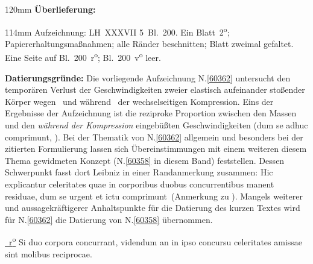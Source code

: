 \begin{ledgroupsized}[r]{120mm}
\footnotesize
\pstart
\noindent\textbf{Überlieferung:}
\pend
\end{ledgroupsized}
\begin{ledgroupsized}[r]{114mm}
\footnotesize
\pstart \parindent -6mm
%
Aufzeichnung:
LH~XXXVII 5~Bl.~200.
Ein Blatt~2\textsuperscript{o};
Papiererhaltungsmaßnahmen;
alle Ränder beschnitten;
Blatt zweimal gefaltet.
Eine Seite auf Bl.~200~r\textsuperscript{o}; Bl.~200~v\textsuperscript{o} leer.
\pend
\end{ledgroupsized}
\vspace{5mm}
\begin{ledgroup}
\footnotesize
\pstart
\noindent%
\textbf{Datierungsgründe:}
Die vorliegende Aufzeichnung N.\;\ref{60362} untersucht den temporären
Verlust der Geschwindigkeiten zweier elastisch aufeinander stoßender Körper wegen \textendash\ und während \textendash\ der wechselseitigen Kompression.
Eins der Ergebnisse der Aufzeichnung ist die reziproke Proportion zwischen den Massen und den \textit{während der Kompression} eingebüßten Geschwindigkeiten
(\glqq dum se adhuc comprimunt\grqq, ).
Bei der Thematik von N.\;\ref{60362} allgemein und besonders bei der zitierten Formulierung 
lassen sich Übereinstimmungen mit einem weiteren diesem Thema gewidmeten Konzept (N.\;\ref{60358} in diesem Band) feststellen.
Dessen Schwerpunkt fasst dort Leibniz in einer Randanmerkung zusammen: 
\glqq Hic explicantur celeritates quae in corporibus duobus concurrentibus manent residuae, dum se urgent et ictu comprimunt\grqq\ (Anmerkung zu ).
\pend
\pstart
Mangels weiterer und aussagekräftigerer Anhaltspunkte für die Datierung des kurzen Textes wird für N.\;\ref{60362} die Datierung von N.\;\ref{60358} übernommen.
\pend 
\end{ledgroup}
\vspace{8mm}
\pstart
\noindent
\href{\Scan{LH_37_05_200r}}%
{~r\textsuperscript{o}\rbrack}
Si duo corpora 
concurrant,
videndum
an in ipso concursu celeritates amissae%
sint molibus
%
reciprocae.%
%
